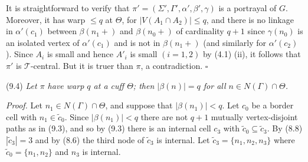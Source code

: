 It is straightforward to verify that $\pi' = (\Sigma', \Gamma', \alpha', \beta', \gamma)$ is a portrayal of $G$. Moreover, it has warp $\le q$ at $\Theta$, for $|V(A_1 \cap A_2)| \le q$, and there is no linkage in $\alpha'(c_1)$ between $\beta(n_1 +)$ and $\beta(n_0 +)$ of cardinality $q + 1$ since $\gamma(n_0)$ is an isolated vertex of $\alpha'(c_1)$ and is not in $\beta(n_1 +)$ (and similarly for $\alpha'(c_2)$). Since $A_i$ is small and hence $A'_i$ is small $(i = 1, 2)$ by (4.1) (ii), it follows that $\pi'$ is $\mathcal{T}$-central. But it is truer than $\pi$, a contradiction. $\square$

\stmt
(9.4) \textit{Let $\pi$ have warp $q$ at a cuff $\Theta$; then $|\beta(n)| = q$ for all $n \in N(\Gamma) \cap \Theta$.}

\textit{Proof.} Let $n_1 \in N(\Gamma) \cap \Theta$, and suppose that $|\beta(n_1)| < q$. Let $c_0$ be a border cell with $n_1 \in \tilde{c}_0$. Since $|\beta(n_1)| < q$ there are not $q + 1$ mutually vertex-disjoint paths as in (9.3), and so by (9.3) there is an internal cell $c_3$ with $\tilde{c}_0 \subseteq \tilde{c}_3$. By (8.8) $|\tilde{c}_3| = 3$ and by (8.6) the third node of $\tilde{c}_3$ is internal. Let $\tilde{c}_3 = \{n_1, n_2, n_3\}$ where $\tilde{c}_0 = \{n_1, n_2\}$ and $n_3$ is internal.

